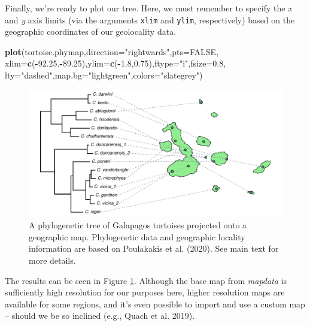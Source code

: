 \documentclass[fleqn,10pt,lineno]{wlpeerj} %
\newenvironment{Shaded}{\begin{snugshade}}{\end{snugshade}}
\newcommand{\AttributeTok}[1]{\textcolor[rgb]{0.13,0.29,0.53}{#1}}
\newcommand{\ConstantTok}[1]{\textcolor[rgb]{0.56,0.35,0.01}{#1}}
\newcommand{\FloatTok}[1]{\textcolor[rgb]{0.00,0.00,0.81}{#1}}
\newcommand{\FunctionTok}[1]{\textcolor[rgb]{0.13,0.29,0.53}{\textbf{#1}}}
\newcommand{\NormalTok}[1]{#1}
\newcommand{\SpecialCharTok}[1]{\textcolor[rgb]{0.81,0.36,0.00}{\textbf{#1}}}
\newcommand{\StringTok}[1]{\textcolor[rgb]{0.31,0.60,0.02}{#1}}
\begin{document}
Finally, we're ready to plot our tree. Here, we must remember to specify the \emph{x} and \emph{y} axis limits (via the arguments \texttt{xlim} and \texttt{ylim}, respectively) based on the geographic coordinates of our geolocality data.

\begin{Shaded}
\begin{Highlighting}[]
\FunctionTok{plot}\NormalTok{(tortoise.phymap,}\AttributeTok{direction=}\StringTok{"rightwards"}\NormalTok{,}\AttributeTok{pts=}\ConstantTok{FALSE}\NormalTok{,}
  \AttributeTok{xlim=}\FunctionTok{c}\NormalTok{(}\SpecialCharTok{{-}}\FloatTok{92.25}\NormalTok{,}\SpecialCharTok{{-}}\FloatTok{89.25}\NormalTok{),}\AttributeTok{ylim=}\FunctionTok{c}\NormalTok{(}\SpecialCharTok{{-}}\FloatTok{1.8}\NormalTok{,}\FloatTok{0.75}\NormalTok{),}\AttributeTok{ftype=}\StringTok{"i"}\NormalTok{,}\AttributeTok{fsize=}\FloatTok{0.8}\NormalTok{,}
  \AttributeTok{lty=}\StringTok{"dashed"}\NormalTok{,}\AttributeTok{map.bg=}\StringTok{"lightgreen"}\NormalTok{,}\AttributeTok{colors=}\StringTok{"slategrey"}\NormalTok{)}
\end{Highlighting}
\end{Shaded}

\begin{figure}
\includegraphics[width=1\linewidth]{Revell.phytools-v2_peerj_files/figure-latex/fig20-tortoise-geog-1} \caption{A phylogenetic tree of Galapagos tortoises projected onto a geographic map. Phylogenetic data and geographic locality information are based on Poulakakis et al. (2020). See main text for more details.}\label{fig:fig20-tortoise-geog}
\end{figure}

The results can be seen in Figure \ref{fig:fig20-tortoise-geog}. Although the base map from \emph{mapdata} is sufficiently high resolution for our purposes here, higher resolution maps are available for some regions, and it's even possible to import and use a custom map -- should we be so inclined (e.g., Quach et al. 2019).
\end{document}
